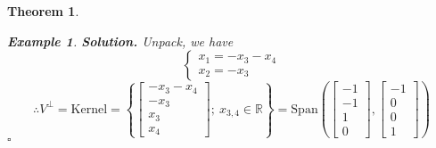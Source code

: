 \documentclass[12pt, a4paper]{article}
\newtheorem{thm}{Theorem}[subsection]
\newtheorem{eg}{Example}[subsection]
\newenvironment*{sol}{\par\indent\textbf{\textit{Solution. }}}{\hfill{$\square$}\par}
\def\R{{\mathbb{R}}}
\def\Span{\mathrm{Span}}
\begin{document}
\begin{thm}
\begin{eg}
\begin{sol}
		Unpack, we have \[\begin{cases}x_1=-x_3-x_4\\x_2=-x_3\end{cases}\]
		\[\therefore V^\perp=\text{Kernel}=\left\{\begin{bmatrix}-x_3-x_4\\-x_3\\x_3\\x_4\end{bmatrix};\ x_{3,4}\in\R\right\}=\Span\left(\begin{bmatrix}-1\\-1\\1\\0\end{bmatrix},\begin{bmatrix}-1\\0\\0\\1\end{bmatrix}\right)\]
	\end{sol}
	\end{eg}
\end{thm}
\end{document}
